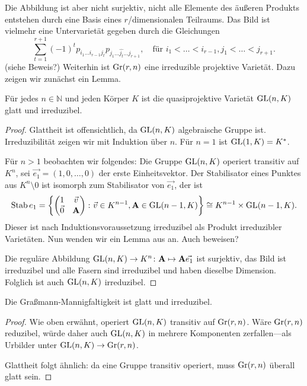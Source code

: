 Die Abbildung ist aber nicht surjektiv, nicht alle Elemente des äußeren Produkts entstehen durch eine Basis eines $r$\-/dimensionalen Teilraums. Das Bild ist vielmehr eine Untervarietät gegeben durch die Gleichungen
\begin{equation}
\sum_{t=1}^{r+1} (-1)^t p_{i_1 \dots i_{r-1} j_t} p_{j_1 \dots \hat{j_t} \dots j_{r+1}}, \quad\text{für } i_1 < \dots < i_{r-1}, j_1 < \dots < j_{r+1}.
\end{equation}
(siehe \cite[S.~42]{Shafarevich} \note Beweis?) Weiterhin ist $\grass r/n$ eine irreduzible projektive Varietät. Dazu zeigen wir zunächst ein Lemma.

\begin{prop}
Für jedes $n \in \mathbb N$ und jeden Körper $K$ ist die quasiprojektive Varietät $\mathrm{GL}(n,K)$ glatt und irreduzibel.
\end{prop}
\begin{proof}
Glattheit ist offensichtlich, da $\mathrm{GL}(n,K)$ algebraische Gruppe ist. Irreduzibilität zeigen wir mit Induktion über $n$. Für $n=1$ ist $\mathrm{GL}(1,K) = K^*$.

Für $n>1$ beobachten wir folgendes: Die Gruppe $\mathrm{GL}(n,K)$ operiert transitiv auf $K^n$, sei $\vec{e_1} = (1,0,\dots,0)$ der erste Einheitsvektor. Der Stabilisator eines Punktes aus $K^n \setminus 0$ ist isomorph zum Stabilisator von $\vec{e_1}$, der ist
\begin{equation}
\operatorname{Stab} e_1 = \left\{ \begin{pmatrix}
1 & \vec v \\
\vec 0 & \mathbf{A}
\end{pmatrix} \colon \vec v \in K^{n-1}, \mathbf{A} \in \mathrm{GL}(n-1,K) \right\} \cong K^{n-1} \times \mathrm{GL}(n-1,K).
\end{equation}
Dieser ist nach Induktionsvoraussetzung irreduzibel als Produkt irreduzibler Varietäten. Nun wenden wir ein Lemma aus \cite[S.~79]{Shafarevich} an. \note Auch beweisen?

Die reguläre Abbildung $\mathrm{GL}(n,K) \rightarrow K^n \colon \mathbf{A} \mapsto \mathbf{A} \vec{e_1}$ ist surjektiv, das Bild ist irreduzibel und alle Fasern sind irreduzibel und haben dieselbe Dimension. Folglich ist auch $\mathrm{GL}(n,K)$ irreduzibel.
\end{proof}

\begin{prop}
Die Graßmann-Mannigfaltigkeit ist glatt und irreduzibel.
\end{prop}
\begin{proof}
Wie oben erwähnt, operiert $\mathrm{GL}(n,K)$ transitiv auf $\grass r/n$. Wäre $\grass r/n$ reduzibel, würde daher auch $\mathrm{GL}(n,K)$ in mehrere Komponenten zerfallen---als Urbilder unter $\GL nK \to \grass r/n$.

Glattheit folgt ähnlich: da eine Gruppe transitiv operiert, muss $\grass r/n$ überall glatt sein.
\end{proof}

